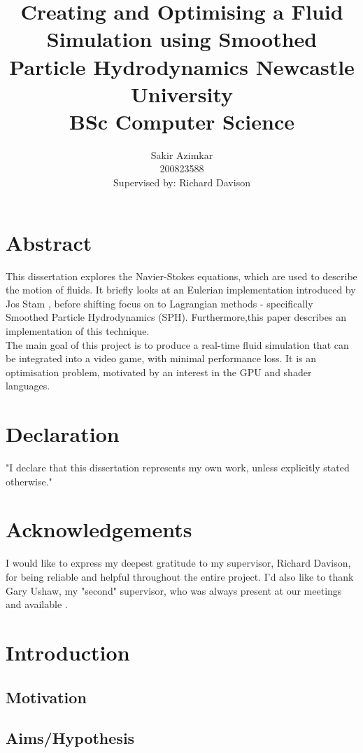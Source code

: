 \documentclass{article}
\title
{
    {Creating and Optimising a Fluid Simulation using Smoothed Particle Hydrodynamics}
    {\large Newcastle University} \\
    {\large BSc Computer Science}
}
\author
{
    Sakir Azimkar \\
    200823588 \\
    Supervised by: Richard Davison
}
\date{}
\begin{document}
    \maketitle
    \newpage
    \tableofcontents
    \newpage
    \listoffigures
    \newpage

    \section{Abstract}
    This dissertation explores the Navier-Stokes equations, which are used to describe the motion of fluids. It briefly looks at an Eulerian implementation introduced by Jos Stam \cite{stam}, before shifting focus on to Lagrangian methods - specifically Smoothed Particle Hydrodynamics (SPH). Furthermore,this paper describes an implementation of this technique. \\ The main goal of this project is to produce a real-time fluid simulation that can be integrated into a video game, with minimal performance loss. It is an optimisation problem, motivated by an interest in the GPU and shader languages.
    
    \newpage

    \section{Declaration} "I declare that this dissertation represents my own work, unless explicitly stated otherwise."

    \newpage

    \section{Acknowledgements}
    I would like to express my deepest gratitude to my supervisor, Richard Davison, for being reliable and helpful throughout the entire project. I'd also like to thank Gary Ushaw, my "second" supervisor, who was always present at our meetings and available .
    
    \section{Introduction}
    
    \subsection{Motivation}
    \subsection{Aims/Hypothesis}
\end{document}
